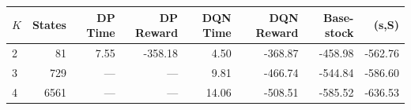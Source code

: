 \begin{tabular}{lrrrrrrr}
\hline
$K$ & States & DP Time & DP Reward & DQN Time & DQN Reward & Base-stock & (s,S) \\
\hline
2 & 81 & 7.55 & -358.18 & 4.50 & -368.87 & -458.98 & -562.76 \\
3 & 729 & --- & --- & 9.81 & -466.74 & -544.84 & -586.60 \\
4 & 6561 & --- & --- & 14.06 & -508.51 & -585.52 & -636.53 \\
\hline
\end{tabular}